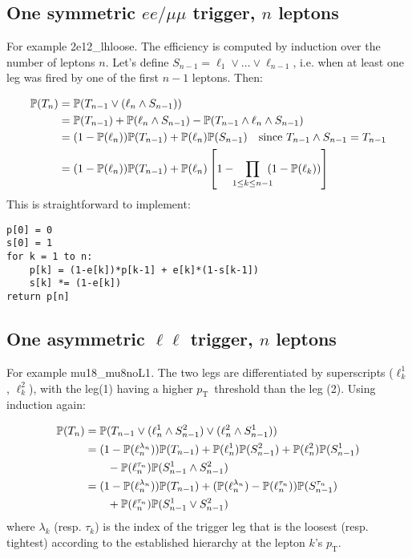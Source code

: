 \documentclass{article}
\newcommand{\pt}{\ensuremath{p_\mathrm{T}}}
\newcommand{\pro}{\ensuremath{\mathbb{P}}}
\begin{document}
\subsection{One symmetric $ee/\mu\mu$ trigger, $n$ leptons}

For example \textrm{2e12\_lhloose}. 
The efficiency is computed by induction over the number of leptons $n$. 
Let's define $S_{n-1}=\ell_1\vee\ldots\vee\ell_{n-1}$, i.e. when at least one leg was fired by one of the first $n-1$ leptons. 
Then: 

\begin{align}
\pro(T_n) &= \pro(T_{n-1}  \vee (\ell_n\wedge S_{n-1}))\notag\\
&= \pro(T_{n-1}) + \pro(\ell_n\wedge S_{n-1}) - \pro(T_{n-1}\wedge \ell_n\wedge S_{n-1})\notag\\
&= (1-\pro(\ell_n))\pro(T_{n-1})+\pro(\ell_n)\pro(S_{n-1})\quad\text{since }T_{n-1}\wedge S_{n-1}=T_{n-1}\notag\\
&= (1-\pro(\ell_n))\pro(T_{n-1})+\pro(\ell_n)\left[1-\!\!\prod_{1\leq k\leq n-1}\!\!\!(1-\pro(\ell_k))\right]
\label{e:2s}
\end{align}
This is straightforward to implement: 

\begin{verbatim}
p[0] = 0
s[0] = 1
for k = 1 to n:
    p[k] = (1-e[k])*p[k-1] + e[k]*(1-s[k-1])
    s[k] *= (1-e[k])
return p[n]
\end{verbatim}

\subsection{One asymmetric $\ell\ell$ trigger, $n$ leptons}

For example \textrm{mu18\_mu8noL1}. The two legs are differentiated by superscripts ($\ell_k^1$, $\ell_k^2$), 
with the leg(1) having a higher \pt\ threshold than the leg (2). 
Using induction again: 

\begin{align}
\pro(T_n) &= 
\pro(T_{n-1}\vee (\ell_n^1 \wedge S_{n-1}^2) \vee (\ell_n^2 \wedge S_{n-1}^1))\notag\\
&=(1-\pro(\ell_n^{\lambda_n}))\pro(T_{n-1})
+\pro(\ell_n^1)\pro(S_{n-1}^2) + \pro(\ell_n^2)\pro(S_{n-1}^1)\notag\\
&\qquad- \pro(\ell_n^{\tau_n})\pro(S_{n-1}^1\wedge S_{n-1}^2)\notag\\
&=(1-\pro(\ell_n^{\lambda_n}))\pro(T_{n-1})
+(\pro(\ell_n^{\lambda_n})-\pro(\ell_n^{\tau_n}))\pro(S_{n-1}^{\tau_n})\notag\\
&\qquad + \pro(\ell_n^{\tau_n}) \pro(S_{n-1}^1\vee S_{n-1}^2)
\label{e:2a}
\end{align}
where $\lambda_k$ (resp. $\tau_k$) is the index of the trigger leg that is the loosest 
(resp. tightest) according to the established hierarchy at the lepton $k$'s \pt. 
\end{document}
